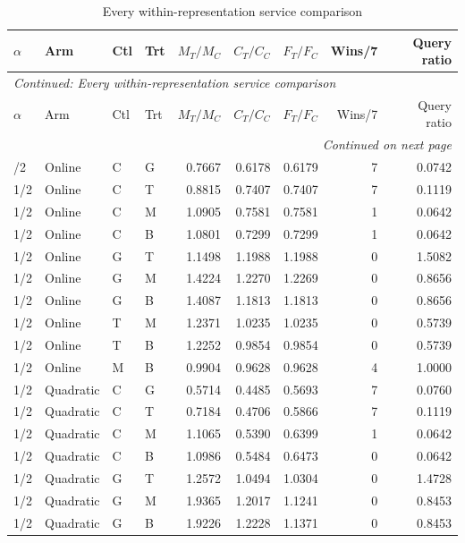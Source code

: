 \begingroup\footnotesize\setlength{\tabcolsep}{3pt}
\begin{longtable}{llllrrrrr}
\caption{Every within-representation service comparison}\label{tab:allservices119b}\\
\toprule
$\alpha$ & Arm & Ctl & Trt & $M_T/M_C$ & $C_T/C_C$ & $F_T/F_C$ & Wins/7 & Query ratio\\\midrule
\endfirsthead
\multicolumn{9}{l}{\textit{Continued: Every within-representation service comparison}}\\
\toprule
$\alpha$ & Arm & Ctl & Trt & $M_T/M_C$ & $C_T/C_C$ & $F_T/F_C$ & Wins/7 & Query ratio\\\midrule
\endhead
\midrule\multicolumn{9}{r}{\textit{Continued on next page}}\\
\endfoot
\bottomrule
\endlastfoot
1/2 & Online & C & G & 0.7667 & 0.6178 & 0.6179 & 7 & 0.0742 \\
1/2 & Online & C & T & 0.8815 & 0.7407 & 0.7407 & 7 & 0.1119 \\
1/2 & Online & C & M & 1.0905 & 0.7581 & 0.7581 & 1 & 0.0642 \\
1/2 & Online & C & B & 1.0801 & 0.7299 & 0.7299 & 1 & 0.0642 \\
1/2 & Online & G & T & 1.1498 & 1.1988 & 1.1988 & 0 & 1.5082 \\
1/2 & Online & G & M & 1.4224 & 1.2270 & 1.2269 & 0 & 0.8656 \\
1/2 & Online & G & B & 1.4087 & 1.1813 & 1.1813 & 0 & 0.8656 \\
1/2 & Online & T & M & 1.2371 & 1.0235 & 1.0235 & 0 & 0.5739 \\
1/2 & Online & T & B & 1.2252 & 0.9854 & 0.9854 & 0 & 0.5739 \\
1/2 & Online & M & B & 0.9904 & 0.9628 & 0.9628 & 4 & 1.0000 \\
1/2 & Quadratic & C & G & 0.5714 & 0.4485 & 0.5693 & 7 & 0.0760 \\
1/2 & Quadratic & C & T & 0.7184 & 0.4706 & 0.5866 & 7 & 0.1119 \\
1/2 & Quadratic & C & M & 1.1065 & 0.5390 & 0.6399 & 1 & 0.0642 \\
1/2 & Quadratic & C & B & 1.0986 & 0.5484 & 0.6473 & 0 & 0.0642 \\
1/2 & Quadratic & G & T & 1.2572 & 1.0494 & 1.0304 & 0 & 1.4728 \\
1/2 & Quadratic & G & M & 1.9365 & 1.2017 & 1.1241 & 0 & 0.8453 \\
1/2 & Quadratic & G & B & 1.9226 & 1.2228 & 1.1371 & 0 & 0.8453 \\

\end{longtable}
